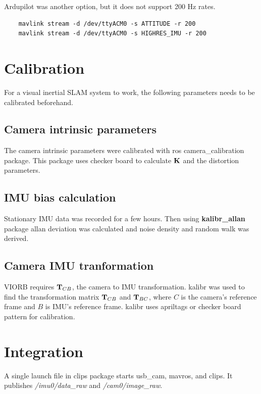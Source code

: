 Ardupilot was another option, but it does not support 200 Hz rates.

\begin{lstlisting}
	mavlink stream -d /dev/ttyACM0 -s ATTITUDE -r 200        
	mavlink stream -d /dev/ttyACM0 -s HIGHRES_IMU -r 200
\end{lstlisting}

\section{Calibration}
For a visual inertial SLAM system to work, the following parameters needs to be calibrated beforehand.
 
\subsection{Camera intrinsic parameters}
The camera intrinsic parameters were calibrated with ros camera\_calibration package. This package uses checker board to calculate ${\bf K}$ and the distortion parameters.

\subsection{IMU bias calculation}
Stationary IMU data was recorded for a few hours. Then using \textbf{kalibr\_allan} package allan deviation was calculated and noise density and random walk was derived.

\subsection{Camera IMU tranformation}
VIORB requires ${\bf T}_{CB}$, the camera to IMU transformation. kalibr was used to find the transformation matrix ${\bf T}_{CB}$ and ${\bf T}_{BC}$, where $C$ is the camera's reference frame and $B$ is IMU's reference frame. kalibr uses apriltags or checker board pattern for calibration.

\section{Integration}
A single launch file in clips package starts usb\_cam, mavros, and clips. It publishes \textit{/imu0/data\_raw} and \textit{/cam0/image\_raw}. 

